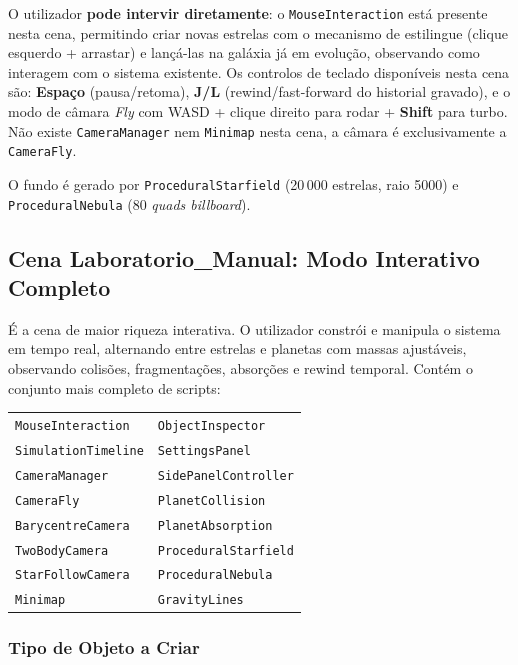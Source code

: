 \documentclass[12pt,a4paper]{article}
\begin{document}
O utilizador \textbf{pode intervir diretamente}: o \texttt{MouseInteraction} est\'{a} presente nesta cena, permitindo criar novas estrelas com o mecanismo de estilingue (clique esquerdo + arrastar) e lan\c{c}\'{a}-las na gal\'{a}xia j\'{a} em evolu\c{c}\~{a}o, observando como interagem com o sistema existente. Os controlos de teclado dispon\'{i}veis nesta cena s\~{a}o: \textbf{Espa\c{c}o} (pausa/retoma), \textbf{J/L} (rewind/fast-forward do historial gravado), e o modo de c\^{a}mara \textit{Fly} com WASD + clique direito para rodar + \textbf{Shift} para turbo. N\~{a}o existe \texttt{CameraManager} nem \texttt{Minimap} nesta cena, a c\^{a}mara \'{e} exclusivamente a \texttt{CameraFly}.

O fundo \'{e} gerado por \texttt{ProceduralStarfield} (20\,000 estrelas, raio 5000) e \texttt{ProceduralNebula} (80 \textit{quads billboard}).

\subsection{Cena Laboratorio\_Manual: Modo Interativo Completo}

\'{E} a cena de maior riqueza interativa. O utilizador constr\'{o}i e manipula o sistema em tempo real, alternando entre estrelas e planetas com massas ajust\'{a}veis, observando colis\~{o}es, fragmenta\c{c}\~{o}es, absor\c{c}\~{o}es e rewind temporal. Cont\'{e}m o conjunto mais completo de scripts:

\begin{center}
  \small
  \begin{tabular}{ll}
    \texttt{MouseInteraction} & \texttt{ObjectInspector} \\
    \texttt{SimulationTimeline} & \texttt{SettingsPanel} \\
    \texttt{CameraManager} & \texttt{SidePanelController} \\
    \texttt{CameraFly} & \texttt{PlanetCollision} \\
    \texttt{BarycentreCamera} & \texttt{PlanetAbsorption} \\
    \texttt{TwoBodyCamera} & \texttt{ProceduralStarfield} \\
    \texttt{StarFollowCamera} & \texttt{ProceduralNebula} \\
    \texttt{Minimap} & \texttt{GravityLines} \\
  \end{tabular}
\end{center}

\subsubsection{Tipo de Objeto a Criar}
\end{document}
